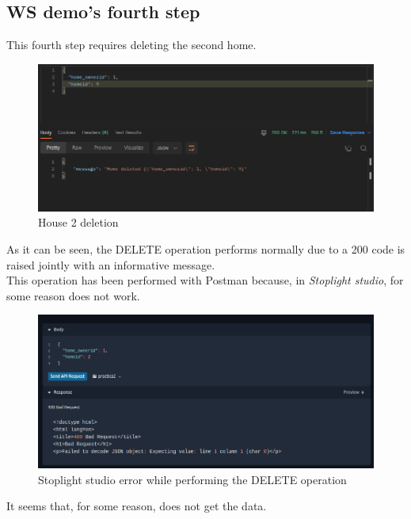 \documentclass[a4paper,12pt]{article}
\begin{document}
\subsection*{WS demo's fourth step}
This fourth step requires deleting the second home.
\begin{figure}[H]
    \centering
    \includegraphics[scale = 0.5]{images/House 2 deletion.png}
    \caption{House 2 deletion}
    \label{fig:house2D}
\end{figure}
As it can be seen, the DELETE operation performs normally due to a 200 code is raised jointly with an informative message.\\
This operation has been performed with Postman because, in \textit{Stoplight studio}, for some reason does not work.
\begin{figure}[H]
    \centering
    \includegraphics[scale = 0.5]{images/Stopligh studio 400 error.png}
    \caption{Stoplight studio error while performing the DELETE operation}
    \label{fig:stoplight}
\end{figure}
It seems that, for some reason, does not get the data.
\end{document}
